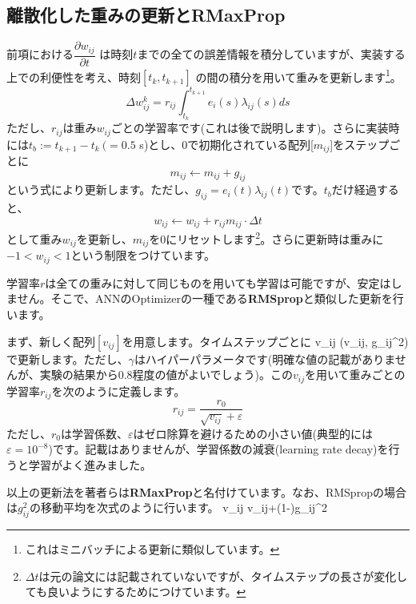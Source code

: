 \subsection{離散化した重みの更新とRMaxProp}
前項における$\dfrac{\partial w_{ij}}{\partial t}$ は時刻$t$までの全ての誤差情報を積分していますが、実装する上での利便性を考え、時刻$[t_k, t_{k+1}]$ の間の積分を用いて重みを更新します\footnote{これはミニバッチによる更新に類似しています。}。
\begin{equation}
\Delta w_{i j}^{k}=r_{ij} \int_{t_{k}}^{t_{k+1}} e_{i}(s) \lambda_{ij}(s) ds      
\end{equation}
ただし、$r_{ij}$は重み$w_{ij}$ごとの学習率です(これは後で説明します)。さらに実装時には$t_b:={t_{k+1}}-{t_{k}}\ (=0.5$ s)とし、0で初期化されている配列[$m_{ij}$]をステップごとに
\begin{equation}
m_{ij} \leftarrow m_{ij} + g_{ij}    
\end{equation}
という式により更新します。ただし、$g_{ij}=e_{i}(t) \lambda_{ij}(t)$です。$t_b$だけ経過すると、
\begin{equation}
w_{ij} \leftarrow w_{ij} + r_{ij}m_{ij}\cdot \Delta t
\end{equation}
として重み$w_{ij}$を更新し、$m_{ij}$を0にリセットします\footnote{$\Delta t$は元の論文には記載されていないですが、タイムステップの長さが変化しても良いようにするためにつけています。}。さらに更新時は重みに$-1<w_{ij}<1$という制限をつけています。\par
学習率$r$は全ての重みに対して同じものを用いても学習は可能ですが、安定はしません。そこで、ANNのOptimizerの一種である\textbf{RMSprop}と類似した更新を行います。\par
まず、新しく配列$[v_{ij}]$を用意します。タイムステップごとに
v_{ij} \leftarrow \max(\gamma v_{ij}, g_{ij}^2)
で更新します。ただし、$\gamma$はハイパーパラメータです(明確な値の記載がありませんが、実験の結果から0.8程度の値がよいでしょう)。この$v_{ij}$を用いて重みごとの学習率$r_{ij}$を次のように定義します。
\begin{equation}
r_{ij}=\frac{r_0}{\sqrt{v_{ij}}+\varepsilon}
\end{equation}
ただし、$r_0$は学習係数、$\varepsilon$はゼロ除算を避けるための小さい値(典型的には$\varepsilon=10^{-8}$)です。記載はありませんが、学習係数の減衰(learning rate decay)を行うと学習がよく進みました。\par
以上の更新法を著者らは\textbf{RMaxProp}と名付けています。なお、RMSpropの場合は$g_{ij}^2$の移動平均を次式のように行います。
v_{ij} \leftarrow \gamma v_{ij}+(1-\gamma)\cdot g_{ij}^2
